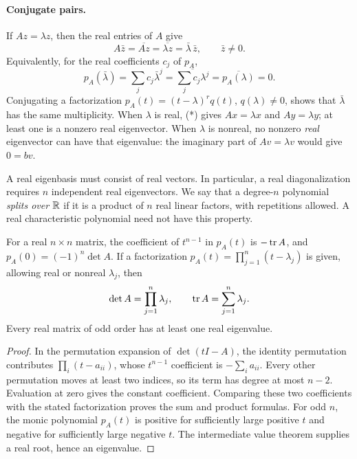 \paragraph{Conjugate pairs.}
If \(Az=\lambda z\), then the real entries of \(A\) give
\[
 A\bar z=\overline{Az}=\overline{\lambda z}
       =\bar\lambda\,\bar z,\qquad \bar z\ne0.
\]
Equivalently, for the real coefficients \(c_j\) of \(p_A\),
\[
 p_A(\bar\lambda)=\sum_jc_j\bar\lambda^j
                =\overline{\sum_jc_j\lambda^j}
                =\overline{p_A(\lambda)}=0.
\]
Conjugating a factorization
\(p_A(t)=(t-\lambda)^r q(t)\), \(q(\lambda)\ne0\), shows that
\(\bar\lambda\) has the same multiplicity.
When \(\lambda\) is real, (*) gives \(Ax=\lambda x\) and
\(Ay=\lambda y\); at least one is a nonzero real eigenvector.
When \(\lambda\) is nonreal, no nonzero \emph{real} eigenvector can
have that eigenvalue: the imaginary part of \(Av=\lambda v\)
would give \(0=bv\).

A real eigenbasis must consist of real vectors. In particular, a real
diagonalization requires \(n\) independent real eigenvectors.
We say that a degree-\(n\) polynomial \emph{splits over \(\mathbb R\)} if it
is a product of \(n\) real linear factors, with repetitions allowed.
A real characteristic polynomial need not have this property.

\begin{proposition}
For a real \(n\times n\) matrix, the coefficient of \(t^{n-1}\) in
\(p_A(t)\) is \(-\operatorname{tr} A\), and \(p_A(0)=(-1)^n\det A\).
If a factorization \(p_A(t)=\prod_{j=1}^n(t-\lambda_j)\) is given,
allowing real or nonreal \(\lambda_j\), then
\[
 \det A=\prod_{j=1}^n\lambda_j,\qquad
 \operatorname{tr} A=\sum_{j=1}^n\lambda_j.
\]
Every real matrix of odd order has at least one real eigenvalue.
\end{proposition}
\begin{proof}
In the permutation expansion of \(\det(tI-A)\), the identity permutation
contributes \(\prod_i(t-a_{ii})\), whose \(t^{n-1}\) coefficient is
\(-\sum_i a_{ii}\). Every other permutation moves at least two indices,
so its term has degree at most \(n-2\). Evaluation at zero gives the
constant coefficient. Comparing these two coefficients with the stated
factorization proves the sum and product formulas.
For odd \(n\), the monic polynomial \(p_A(t)\) is positive for sufficiently
large positive \(t\) and negative for sufficiently large negative \(t\).
The intermediate value theorem supplies a real root, hence an eigenvalue.
\end{proof}

